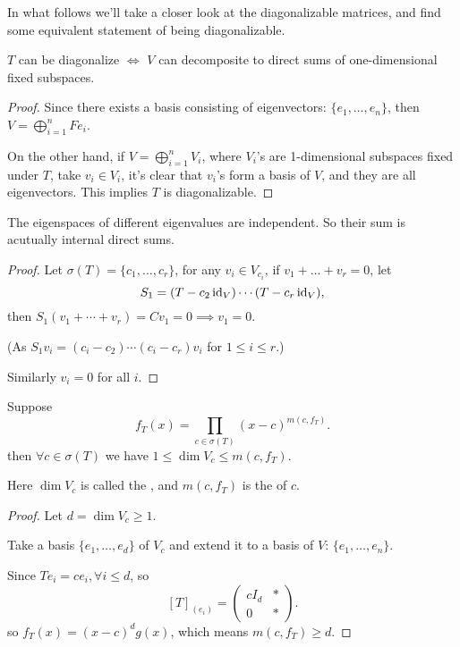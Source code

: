 In what follows we'll take a closer look at the diagonalizable matrices,
and find some equivalent statement of being diagonalizable.

\begin{proposition}
	$T$ can be diagonalize  $\iff$ $V$ can decomposite to direct sums of
	one-dimensional fixed subspaces.
\end{proposition}
\begin{proof}[Proof]
    Since there exists a basis consisting of eigenvectors:
	$\{e_1,\dots,e_n\}$, then $V = \bigoplus_{i=1}^n Fe_i$.

	On the other hand, if $V = \bigoplus_{i=1}^n V_i$,
	where $V_i$'s are 1-dimensional subspaces fixed under  $T$,
	take $v_i\in V_i$, it's clear that $v_i$'s form a basis of  $V$,
	and they are all eigenvectors.
	This implies  $T$ is diagonalizable.
\end{proof}

\begin{proposition}
	The eigenspaces of different eigenvalues are independent.
	So their sum is acutually internal direct sums.
\end{proposition}
\begin{proof}[Proof]
    Let $\sigma(T)=\{c_1,\dots,c_r\}$, for any $v_i\in V_{c_i}$,
	if $v_1+\dots+v_r = 0$,
	let
	\[
	S_1 = (T-c_2\operatorname{id}_V)\cdots (T-c_r\operatorname{id}_V),
	\]
	then $S_1(v_1+\cdots+v_r) = Cv_1 = 0\implies v_1=0$.

	(As $S_1v_i = (c_i-c_2)\cdots (c_i - c_r)v_i$ for  $1\le i\le r$.)

	Similarly $v_i=0$ for all  $i$.
\end{proof}

\begin{proposition}
	Suppose
	\[
		f_T(x)=\prod_{c\in\sigma(T)}(x-c)^{m(c,f_T)}.
	\]
	then $\forall c\in \sigma(T)$ we have  $1\le \dim V_c\le m(c,f_T)$.

	Here $\dim V_c$ is called the ,
	and $m(c,f_T)$ is the  of $c$.
\end{proposition}
\begin{proof}[Proof]
    Let $d=\dim V_c\ge 1$.

	Take a basis $\{e_1,\dots,e_d\}$ of  $V_c$ and extend it to a basis of $V$:
	$\{e_1,\dots,e_n\}$.

	Since $Te_i=ce_i, \forall i\le d$, so
	\[
		[T]_{(e_i)} = \begin{pmatrix}
			cI_d &* \\ 0 &*
		\end{pmatrix}.
	\]
	so $f_T(x)=(x-c)^dg(x)$, which means $m(c,f_T)\ge d$.
\end{proof}

